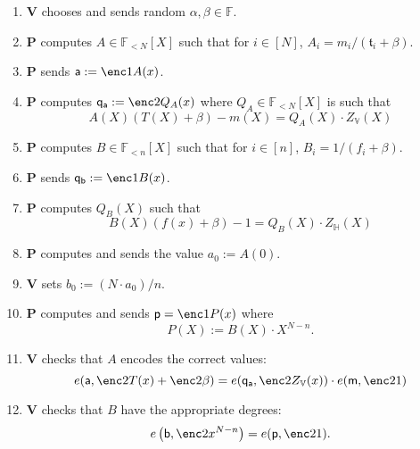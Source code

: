 \documentclass[11pt]{article} %
\newcommand{\F}{\ensuremath{\mathbb F}\xspace}
\newcommand{\defeq}{:=}
\newcommand{\prv}{\ensuremath{\mathsf{\mathbf{P}}}\xspace}
\newcommand{\ver}{\ensuremath{\mathsf{\mathbf{V}}}\xspace}
\newcommand{\polysofdeg}[1]{\ensuremath{\F_{< #1}[X]}\xspace}
\newcommand{\subspace}{\ensuremath{\mathbb{H}}\xspace}
\newcommand{\bigspace}{\ensuremath{\mathbb{V}}\xspace}
\newcommand{\witsize}{\ensuremath{n}\xspace}
\newcommand{\tabsize}{\ensuremath{N}\xspace}
\newcommand{\tab}{\ensuremath{\mathfrak{t}}\xspace}
\renewcommand{\a}{\ensuremath{\mathsf{a}}\xspace}
\renewcommand{\b}{\ensuremath{\mathsf{b}}\xspace}
\renewcommand{\p}{\ensuremath{\mathsf{p}}\xspace}
\newcommand{\qa}{\ensuremath{\mathsf{q_a}}\xspace}
\newcommand{\qb}{\ensuremath{\mathsf{q_b}}\xspace}
\newcommand{\m}{\ensuremath{\mathsf{m}}\xspace}
\begin{document}
\begin{enumerate}
 \item \ver chooses and sends random $\alpha,\beta \in \F$.
\item \prv computes $A\in \polysofdeg{\tabsize}$ such that for $i\in [\tabsize]$, $A_i = m_i/(\tab_i+\beta)$.
\item \prv sends $\a\defeq \enc1{A(x)}$.
\item\label{step:computeQA} \prv computes $\qa \defeq \enc2{Q_A(x)}$ where $Q_A\in \polysofdeg{\tabsize}$ is such that 
\[A(X)(T(X)+\beta)-m(X)= Q_A(X)\cdot Z_\bigspace(X)\]
\item \prv computes $B\in \polysofdeg{\witsize}$ such that for $i\in [\witsize]$, $B_i=1/(f_i+\beta)$.
\item \prv sends $\qb\defeq \enc1{B(x)}$.
\item \prv computes $Q_B(X)$ such that 
\[B(X)(f(x)+\beta)-1 = Q_B(X)\cdot Z_\subspace(X)\]
\item \prv computes and sends the value $a_0\defeq A(0)$.
\item \ver  sets $b_0\defeq (\tabsize\cdot a_0)/\witsize$.
\item \prv computes and sends $\p=\enc1{P(x)}$ where
\[P(X)\defeq  B(X)\cdot X^{\tabsize-\witsize}. \]
\item\label{step:checkqa} \ver checks that $A$ encodes the correct values:
\[e(\a,\enc2{T(x)}+\enc2{\beta} )=e(\qa,\enc2{Z_\bigspace(x)})\cdot e(\m,\enc2{1})\]
\item\label{step:checkadeg} \ver checks that $B$ have the appropriate degrees:
\[e\left(\b,\enc2{x^{\tabsize-\witsize}}\right)=e(\p,\enc2{1}).\]
 \end{enumerate}
\end{document}
